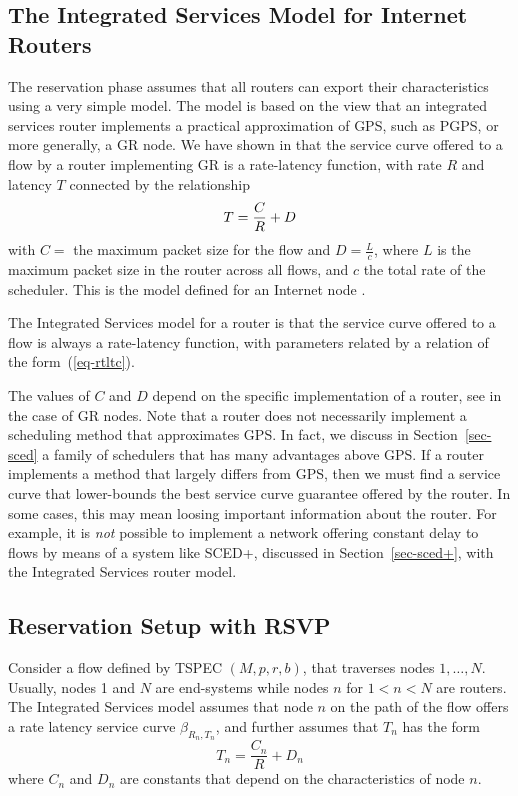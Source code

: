 \subsection{The Integrated Services Model for Internet Routers}

The reservation phase assumes that all routers can export their
characteristics using a very simple model. The model is based on
the view that an integrated services router implements a practical
approximation of GPS, such as PGPS, or more generally, a GR node.
We have shown in  that the service curve offered to a
flow by a router implementing GR is a rate-latency function, with
rate $R$ and latency $T$ connected by the relationship
\begin{equation}\mylabel{eq-rtltc}
  T = \frac{C}{R} + D
\end{equation}
with $C=$ the maximum packet size for the flow and
$D=\frac{L}{c}$, where $L$ is the maximum packet size in the
router across all flows, and $c$ the total rate of the scheduler.
This is the model defined for an Internet node \cite{SV96}.

\begin{fact}
The Integrated Services model for a router is that the service
curve offered to a flow is always a rate-latency function, with
parameters related by a relation of the form~(\ref{eq-rtltc}).
\end{fact}

The values of $C$ and $D$ depend on the specific implementation of
a router, see  in the case of GR nodes. Note
that a router does not necessarily implement a scheduling method
that approximates GPS. In fact, we discuss in
Section~\ref{sec-sced} a family of schedulers that has many
advantages above GPS. If a router implements a method that largely
differs from GPS, then we must find a service curve that
lower-bounds the best service curve guarantee offered by the
router. In some cases, this may mean loosing important information
about the router. For example, it is \emph{not} possible to
implement a network offering constant delay to flows by means of a
system like SCED+, discussed in Section~\ref{sec-sced+}, with the
Integrated Services router model.
\subsection{Reservation Setup with RSVP}

Consider a flow defined by TSPEC $(M, p, r, b)$, that traverses
nodes $1, \ldots, N$. Usually, nodes 1 and $N$ are end-systems
while nodes $n$ for $1<n<N$ are routers. The Integrated Services
model assumes that node $n$ on the path of the flow offers a rate
latency service curve $\beta_{R_n,T_n}$, and further assumes that
$T_{n}$ has the form
 $$T_{n}=\frac{C_{n}}{R} +D_{n}$$
where $C_{n}$ and $D_{n}$ are constants that depend on the
characteristics of node $n$.

